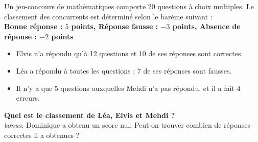 \documentclass[12pt]{article}
\begin{document}
Un jeu-concours de mathématiques comporte 20 questions à choix multiples. Le classement des concurrents est déterminé selon le barème suivant : \\
\textbf{Bonne réponse : $5$ points, Réponse fausse : $-3$ points, Absence de réponse : $-2$ points}


\begin{itemize}
\item Elvis n’a répondu qu’à 12 questions et 10 de ses réponses sont correctes.
\item Léa a répondu à toutes les questions ; 7 de ses réponses sont fausses.
\item Il n’y a que 5 questions auxquelles Mehdi n’a pas répondu, et il a fait 4 erreurs.
\end{itemize}

\textbf{Quel est le classement de Léa, Elvis et Mehdi ?}\\

\textit{bonus.} Dominique a obtenu un score nul. Peut-on trouver combien de réponses correctes
il a obtenues ?
\end{document}
